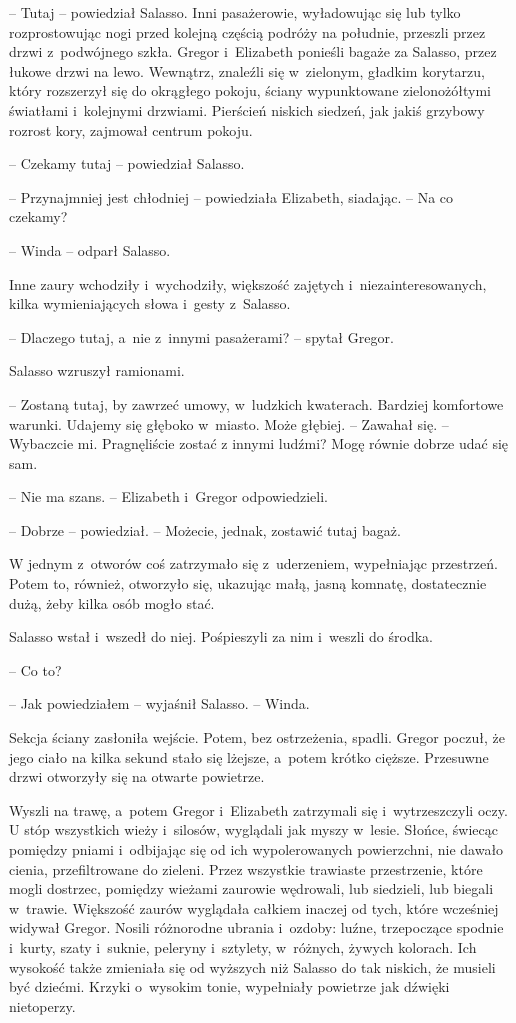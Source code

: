 \documentclass[oneside,polish,12pt,sfheadings]{mwbk}
\begin{document}
-- Tutaj -- powiedział Salasso. Inni pasażerowie, wyładowując się lub
tylko rozprostowując nogi przed kolejną częścią podróży na południe,
przeszli przez drzwi z~podwójnego szkła. Gregor i~Elizabeth ponieśli
bagaże za Salasso, przez łukowe drzwi na lewo. Wewnątrz, znaleźli się w~zielonym, gładkim korytarzu, który rozszerzył się do okrągłego pokoju,
ściany wypunktowane zielonożółtymi światłami i~kolejnymi drzwiami.
Pierścień niskich siedzeń, jak jakiś grzybowy rozrost kory, zajmował
centrum pokoju.

-- Czekamy tutaj -- powiedział Salasso.

-- Przynajmniej jest chłodniej -- powiedziała Elizabeth, siadając. -- Na co
czekamy?

-- Winda -- odparł Salasso.

Inne zaury wchodziły i~wychodziły, większość zajętych i~niezainteresowanych, kilka wymieniających słowa i~gesty z~Salasso.

-- Dlaczego tutaj, a~nie z~innymi pasażerami? -- spytał Gregor.

Salasso wzruszył ramionami. 

-- Zostaną tutaj, by zawrzeć umowy, w~ludzkich kwaterach. Bardziej komfortowe warunki. Udajemy się głęboko w~miasto. Może głębiej. -- Zawahał się. -- Wybaczcie mi. Pragnęliście zostać
z innymi ludźmi? Mogę równie dobrze udać się sam.

-- Nie ma szans. -- Elizabeth i~Gregor odpowiedzieli.

-- Dobrze -- powiedział. -- Możecie, jednak, zostawić tutaj bagaż.

W jednym z~otworów coś zatrzymało się z~uderzeniem, wypełniając
przestrzeń. Potem to, również, otworzyło się, ukazując małą, jasną
komnatę, dostatecznie dużą, żeby kilka osób mogło stać.

Salasso wstał i~wszedł do niej. Pośpieszyli za nim i~weszli do środka.

-- Co to?

-- Jak powiedziałem -- wyjaśnił Salasso. -- Winda.

Sekcja ściany zasłoniła wejście. Potem, bez ostrzeżenia, spadli. Gregor
poczuł, że jego ciało na kilka sekund stało się lżejsze, a~potem krótko
cięższe. Przesuwne drzwi otworzyły się na otwarte powietrze.

Wyszli na trawę, a~potem Gregor i~Elizabeth zatrzymali się i~wytrzeszczyli oczy. U stóp wszystkich wieży i~silosów, wyglądali jak
myszy w~lesie. Słońce, świecąc pomiędzy pniami i~odbijając się od ich
wypolerowanych powierzchni, nie dawało cienia, przefiltrowane do
zieleni. Przez wszystkie trawiaste przestrzenie, które mogli dostrzec,
pomiędzy wieżami zaurowie wędrowali, lub siedzieli, lub biegali w~trawie. Większość zaurów wyglądała całkiem inaczej od tych, które
wcześniej widywał Gregor. Nosili różnorodne ubrania i~ozdoby: luźne,
trzepoczące spodnie i~kurty, szaty i~suknie, peleryny i~sztylety, w~różnych, żywych kolorach. Ich wysokość także zmieniała się od wyższych
niż Salasso do tak niskich, że musieli być dziećmi. Krzyki o~wysokim
tonie, wypełniały powietrze jak dźwięki nietoperzy.
\end{document}
